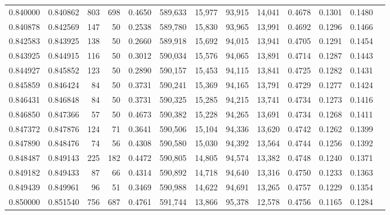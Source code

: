 \begin{tabular}{rrrrrrrrrrrrr}
0.840000 & 0.840862 &   803 & 698 &                                     0.4650 & 589,633 &  15,977 &  93,915 &  14,041 & 0.4678 & 0.1301 & 0.1480 \\
0.840878 & 0.842569 &   147 &  50 &                                     0.2538 & 589,780 &  15,830 &  93,965 &  13,991 & 0.4692 & 0.1296 & 0.1466 \\
0.842583 & 0.843925 &   138 &  50 &                                     0.2660 & 589,918 &  15,692 &  94,015 &  13,941 & 0.4705 & 0.1291 & 0.1454 \\
0.843925 & 0.844915 &   116 &  50 &                                     0.3012 & 590,034 &  15,576 &  94,065 &  13,891 & 0.4714 & 0.1287 & 0.1443 \\
0.844927 & 0.845852 &   123 &  50 &                                     0.2890 & 590,157 &  15,453 &  94,115 &  13,841 & 0.4725 & 0.1282 & 0.1431 \\
0.845859 & 0.846424 &    84 &  50 &                                     0.3731 & 590,241 &  15,369 &  94,165 &  13,791 & 0.4729 & 0.1277 & 0.1424 \\
0.846431 & 0.846848 &    84 &  50 &                                     0.3731 & 590,325 &  15,285 &  94,215 &  13,741 & 0.4734 & 0.1273 & 0.1416 \\
0.846850 & 0.847366 &    57 &  50 &                                     0.4673 & 590,382 &  15,228 &  94,265 &  13,691 & 0.4734 & 0.1268 & 0.1411 \\
0.847372 & 0.847876 &   124 &  71 &                                     0.3641 & 590,506 &  15,104 &  94,336 &  13,620 & 0.4742 & 0.1262 & 0.1399 \\
0.847890 & 0.848476 &    74 &  56 &                                     0.4308 & 590,580 &  15,030 &  94,392 &  13,564 & 0.4744 & 0.1256 & 0.1392 \\
0.848487 & 0.849143 &   225 & 182 &                                     0.4472 & 590,805 &  14,805 &  94,574 &  13,382 & 0.4748 & 0.1240 & 0.1371 \\
0.849182 & 0.849433 &    87 &  66 &                                     0.4314 & 590,892 &  14,718 &  94,640 &  13,316 & 0.4750 & 0.1233 & 0.1363 \\
0.849439 & 0.849961 &    96 &  51 &                                     0.3469 & 590,988 &  14,622 &  94,691 &  13,265 & 0.4757 & 0.1229 & 0.1354 \\
0.850000 & 0.851540 &   756 & 687 &                                     0.4761 & 591,744 &  13,866 &  95,378 &  12,578 & 0.4756 & 0.1165 & 0.1284 \\

\end{tabular}
